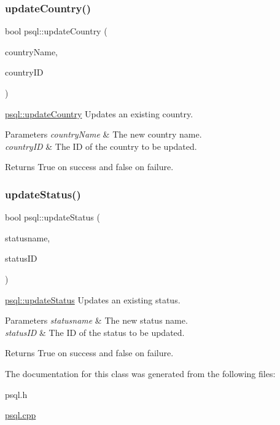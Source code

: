 \subsubsection{\texorpdfstring{update\+Country()}{updateCountry()}}
{\footnotesize\ttfamily bool psql\+::update\+Country (\begin{DoxyParamCaption}\item[{Q\+String}]{country\+Name,  }\item[{int}]{country\+ID }\end{DoxyParamCaption})}



\mbox{\hyperlink{classpsql_ae662278c5fb8ff3471ee1442e69482e2}{psql\+::update\+Country}} Updates an existing country. 


\begin{DoxyParams}{Parameters}
{\em country\+Name} & The new country name. \\
\hline
{\em country\+ID} & The ID of the country to be updated. \\
\hline
\end{DoxyParams}
\begin{DoxyReturn}{Returns}
True on success and false on failure. 
\end{DoxyReturn}
\mbox{\label{classpsql_a620364c99c98e20720908deb045536a0}} 
\subsubsection{\texorpdfstring{update\+Status()}{updateStatus()}}
{\footnotesize\ttfamily bool psql\+::update\+Status (\begin{DoxyParamCaption}\item[{Q\+String}]{statusname,  }\item[{int}]{status\+ID }\end{DoxyParamCaption})}



\mbox{\hyperlink{classpsql_a620364c99c98e20720908deb045536a0}{psql\+::update\+Status}} Updates an existing status. 


\begin{DoxyParams}{Parameters}
{\em statusname} & The new status name. \\
\hline
{\em status\+ID} & The ID of the status to be updated. \\
\hline
\end{DoxyParams}
\begin{DoxyReturn}{Returns}
True on success and false on failure. 
\end{DoxyReturn}


The documentation for this class was generated from the following files\+:\begin{DoxyCompactItemize}
\item 
psql.\+h\item 
\mbox{\hyperlink{psql_8cpp}{psql.\+cpp}}\end{DoxyCompactItemize}
